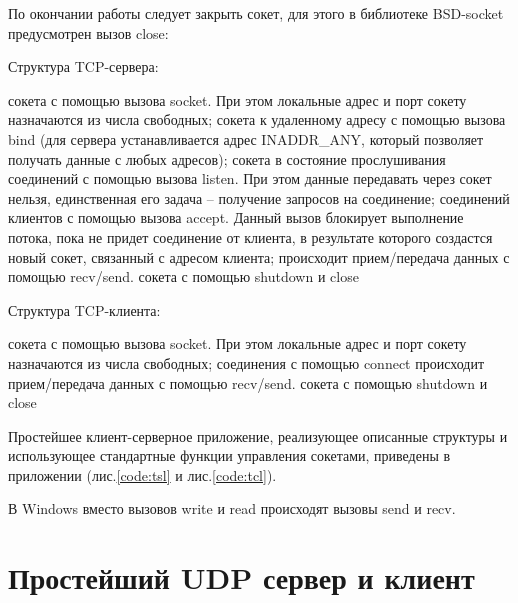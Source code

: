 
\parindent=1cm

По окончании работы следует закрыть сокет, для этого в библиотеке BSD-socket предусмотрен вызов close:


\parindent=1cm

\vspace{3mm}

Структура TCP-сервера: 
\vspace{3mm}

\begin{enumerate}
 сокета с помощью вызова socket. При этом локальные адрес и порт сокету назначаются из числа свободных;  
 сокета к удаленному адресу с помощью вызова bind (для сервера устанавливается адрес INADDR\_ANY, который позволяет получать данные с любых адресов); 
 сокета в состояние прослушивания соединений с помощью вызова listen. При этом данные передавать через сокет нельзя, единственная его задача – получение запросов на соединение; 
 соединений клиентов с помощью вызова accept. Данный вызов блокирует выполнение потока, пока не придет соединение от клиента, в результате которого создастся новый сокет, связанный с адресом клиента; 
 происходит прием/передача данных с помощью recv/send.
 сокета с помощью shutdown и close
\end{enumerate}

Структура TCP-клиента: 
\vspace{3mm}

\begin{enumerate}
 сокета с помощью вызова socket. При этом локальные адрес и порт сокету назначаются из числа свободных;  
 соединения с помощью connect
 происходит прием/передача данных с помощью recv/send.
 сокета с помощью shutdown и close
\end{enumerate}

Простейшее клиент-серверное приложение, реализующее описанные структуры и использующее стандартные функции управления сокетами, приведены в приложении (лис.\ref{code:tsl} и лис.\ref{code:tcl}).

В Windows вместо вызовов write и read происходят вызовы send и recv.  

\section{Простейший UDP сервер и клиент}

